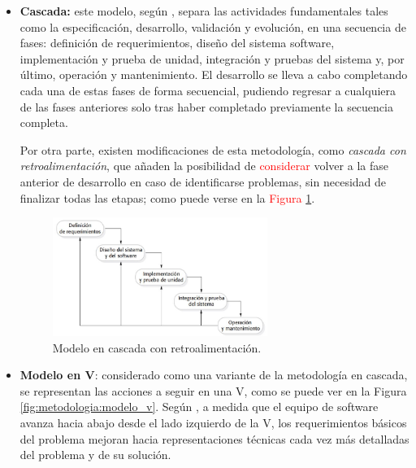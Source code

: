         \begin{itemize}
        \item \textbf{Cascada:} este modelo, según  \cite{sommerville_software_2011}, separa las actividades fundamentales tales como la especificación, desarrollo, validación y evolución, en una secuencia de fases: definición de requerimientos, diseño del sistema software, implementación y prueba de unidad, integración y pruebas del sistema y, por último, operación y mantenimiento. El desarrollo se lleva a cabo completando cada una de estas fases de forma secuencial, pudiendo regresar a cualquiera de las fases anteriores solo tras haber completado previamente la secuencia completa.
    
        Por otra parte, existen modificaciones de esta metodología, como \textit{cascada con retroalimentación}, que añaden la posibilidad de \textcolor{red}{considerar} volver a la fase anterior de desarrollo en caso de identificarse problemas, sin necesidad de finalizar todas las etapas; como puede verse en la \textcolor{red}{Figura} %
        \ref{fig:metodologia:cascada_retroalimentada}.
    
        \begin{figure}[h]
            \centering
            \includegraphics[width=0.66\textwidth]{figures/cascada retroalimentada.JPG}
            \caption[Modelo en cascada con retroalimentación, extraído de \cite{sommerville_software_2011}]{Modelo en cascada con retroalimentación.}
            \label{fig:metodologia:cascada_retroalimentada}
        \end{figure}
        
        \item \textbf{Modelo en V}: considerado como una variante de la metodología en cascada, se representan las acciones a seguir en una V, como se puede ver en la Figura \ref{fig:metodologia:modelo_v}. Según \cite{pressman_software_2005}, a medida que el equipo de software avanza hacia abajo desde el lado izquierdo de la V, los requerimientos básicos del problema mejoran hacia representaciones técnicas cada vez más detalladas del problema y de su solución. 
        

\end{itemize}

